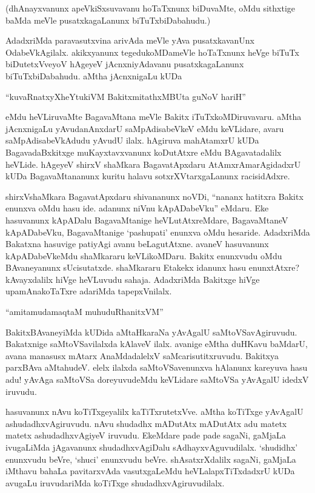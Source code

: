 (dhAnayxvanunx apeVkiSxsuvavanu hoTaTxnunx biDuvaMte, oMdu sithxtige baMda meVle pusatxkagaLanunx biTuTxbiDabahudu.)

AdadxriMda paravasutxvina arivAda meVle yAva pusatxkavanUnx OdabeVkAgilalx. akikxyanunx tegedukoMDameVle hoTaTxnunx heVge biTuTx biDutetxVveyoV hAgeyeV jAcnxniyAdavanu pusatxkagaLanunx biTuTxbiDabahudu. aMtha jAcnxnigaLu kUDa

\begin{shloka}
``kuvaRnatxyXheYtukiVM BakitxmitathxMBUta guNoV hariH''
\end{shloka}

eMdu heVLiruvaMte BagavaMtana meVle Bakitx iTuTxkoMDiruvavaru. aMtha jAcnxnigaLu yAvudanAnxdarU saMpAdisabeVkeV eMdu keVLidare, avaru saMpAdisabeVkAdudu yAvudU ilalx. hAgiruva mahAtamxrU kUDa BagavadaBxkitxge muKayxtavxvanunx koDutAtxre eMdu BAgavatadalilx heVLide. hAgeyeV shirxV shaMkara BagavatApxdaru AtAmxrAmarAgidadxrU kUDa BagavaMtananunx kuritu halavu sotxrXVtarxgaLanunx racisidAdxre.

shirxVshaMkara BagavatApxdaru shivananunx noVDi, ``nananx hatitxra Bakitx enunxva oMdu hasu ide. adanunx niVnu kApADabeVku'' eMdaru. Eke hasuvanunx kApADalu BagavaMtanige heVLutAtxreMdare, BagavaMtaneV kApADabeVku, BagavaMtanige `pashupati' enunxva oMdu hesaride. AdadxriMda Bakatxna hasuvige patiyAgi avanu beLagutAtxne. avaneV hasuvanunx kApADabeVkeMdu shaMkararu keVLikoMDaru. Bakitx enunxvudu oMdu BAvaneyanunx sUcisutatxde. shaMkararu Etakekx idanunx hasu enunxtAtxre? kAvayxdalilx hiVge heVLuvudu sahaja. AdadxriMda Bakitxge hiVge upamAnakoTaTxre adariMda tapepxVnilalx.

\begin{shloka}
``amitamudamaqtaM muhuduRhanitxVM''
\end{shloka}

BakitxBAvaneyiMda kUDida aMtaHkaraNa yAvAgalU saMtoVSavAgiruvudu. Bakatxnige saMtoVSavilalxda kAlaveV ilalx. avanige eMtha duHKavu baMdarU, avana manasusx mAtarx AnaMdadalelxV saMcarisutitxruvudu. Bakitxya parxBAva aMtahudeV. elelx ilalxda saMtoVSavenunxva hAlanunx kareyuva hasu adu! yAvAga saMtoVSa doreyuvudeMdu keVLidare saMtoVSa yAvAgalU idedxV iruvudu.

hasuvanunx nAvu koTiTxgeyalilx kaTiTxrutetxVve. aMtha koTiTxge yAvAgalU ashudadhxvAgiruvudu. nAvu shudadhx mADutAtx mADutAtx adu matetx matetx ashudadhxvAgiyeV iruvudu. EkeMdare pade pade sagaNi, gaMjaLa ivugaLiMda jAgavanunx shudadhxvAgiDalu sAdhayxvAguvudilalx. `shudidhx' enunxvudu beVre, `shuci' enunxvudu beVre. shAsatxrXdalilx sagaNi, gaMjaLa iMthavu bahaLa pavitarxvAda vasutxgaLeMdu heVLalapxTiTxdadxrU kUDa avugaLu iruvudariMda koTiTxge shudadhxvAgiruvudilalx.

